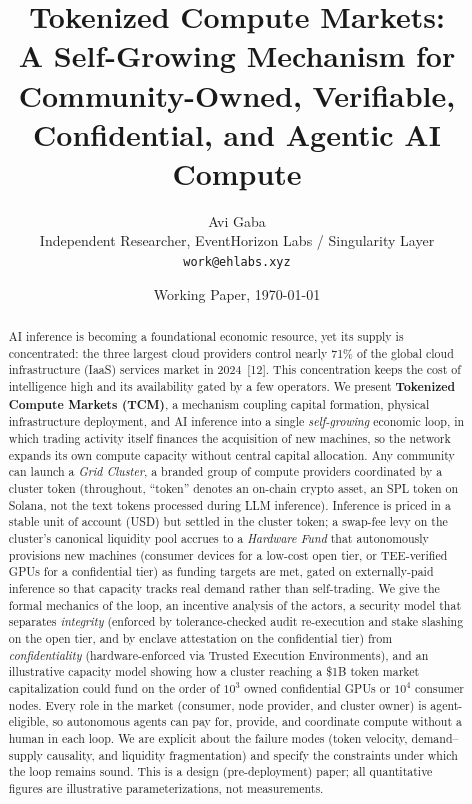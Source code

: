 \documentclass[11pt]{article}
\title{\textbf{Tokenized Compute Markets:\\A Self-Growing Mechanism for Community-Owned, Verifiable, Confidential, and Agentic AI Compute}}
\author{Avi Gaba\\Independent Researcher,  EventHorizon Labs / Singularity Layer\\\texttt{work@ehlabs.xyz}}
\date{Working Paper,  \today}
\begin{document}
\maketitle

\begin{abstract}
\noindent AI inference is becoming a foundational economic resource, yet its supply is concentrated: the three largest cloud providers control nearly 71\% of the global cloud infrastructure (IaaS) services market in 2024~[12]. This concentration keeps the cost of intelligence high and its availability gated by a few operators. We present \textbf{Tokenized Compute Markets (TCM)}, a mechanism coupling capital formation, physical infrastructure deployment, and AI inference into a single \textit{self-growing} economic loop, in which trading activity itself finances the acquisition of new machines, so the network expands its own compute capacity without central capital allocation. Any community can launch a \textit{Grid Cluster}, a branded group of compute providers coordinated by a cluster token (throughout, ``token'' denotes an on-chain crypto asset, an SPL token on Solana, not the text tokens processed during LLM inference). Inference is priced in a stable unit of account (USD) but settled in the cluster token; a swap-fee levy on the cluster's canonical liquidity pool accrues to a \textit{Hardware Fund} that autonomously provisions new machines (consumer devices for a low-cost open tier, or TEE-verified GPUs for a confidential tier) as funding targets are met, gated on externally-paid inference so that capacity tracks real demand rather than self-trading. We give the formal mechanics of the loop, an incentive analysis of the actors, a security model that separates \textit{integrity} (enforced by tolerance-checked audit re-execution and stake slashing on the open tier, and by enclave attestation on the confidential tier) from \textit{confidentiality} (hardware-enforced via Trusted Execution Environments), and an illustrative capacity model showing how a cluster reaching a \$1B token market capitalization could fund on the order of $10^3$ owned confidential GPUs or $10^4$ consumer nodes. Every role in the market (consumer, node provider, and cluster owner) is agent-eligible, so autonomous agents can pay for, provide, and coordinate compute without a human in each loop. We are explicit about the failure modes (token velocity, demand--supply causality, and liquidity fragmentation) and specify the constraints under which the loop remains sound. This is a design (pre-deployment) paper; all quantitative figures are illustrative parameterizations, not measurements.
\end{abstract}
\end{document}
